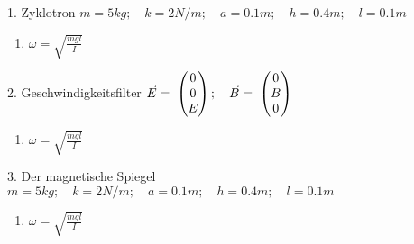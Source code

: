 \documentclass{alex_hü}
\begin{document}
\renewcommand{\labelenumi}{(\alph{enumi})}

\begin{mybox}{1. Zyklotron}
	\centering \( m = 5 \unit{kg};\quad k = 2 \unit{N/m};\quad a = 0.1 \unit{m};\quad h = 0.4 \unit{m};\quad l = 0.1 \unit{m} \)
	\tcblower
	\begin{enumerate}
		\item \( \omega = \sqrt{\tfrac{mgl}{I}} \)
	\end{enumerate}
\end{mybox}

\begin{mybox}{2. Geschwindigkeitsfilter}
	\centering \( \vec{E} = \hspace{0.1cm} \begin{pmatrix}0\\ 0\\ E\end{pmatrix};\quad \vec{B} = \hspace{0.1cm} \begin{pmatrix}0\\ B\\ 0\end{pmatrix} \)
	\tcblower
	\begin{enumerate}
		\item \( \omega = \sqrt{\tfrac{mgl}{I}} \)
	\end{enumerate}
\end{mybox}

\begin{mybox}{3. Der magnetische Spiegel}
	\centering \( m = 5 \unit{kg};\quad k = 2 \unit{N/m};\quad a = 0.1 \unit{m};\quad h = 0.4 \unit{m};\quad l = 0.1 \unit{m} \)
	\tcblower
	\begin{enumerate}
		\item \( \omega = \sqrt{\tfrac{mgl}{I}} \)
	\end{enumerate}
\end{mybox}
\end{document}
